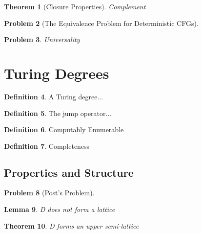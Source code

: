 \documentclass[psamsfonts]{amsart}
\newtheorem{thm}{Theorem}[section]
\newtheorem{lem}[thm]{Lemma}
\newtheorem{prob}[thm]{Problem}
\theoremstyle{definition}
\newtheorem{defn}[thm]{Definition}
\theoremstyle{remark}
\numberwithin{equation}{section}
\begin{document}
\begin{thm}[Closure Properties]
  \cite{sipser13:_introd_theor_comput}
  Complement
\end{thm}

\begin{prob}[The Equivalence Problem for Deterministic CFGs]
\cite{senizergues_det_pd_decid}
\end{prob}

\begin{prob}
  Universality
\end{prob}


\section{Turing Degrees}
\begin{defn}
  A Turing degree...
\cite{post44:_recur}
\cite{kleene54_upper_semi_lattic_degrees_recur_unsol}
\end{defn}

\begin{defn}
  The jump operator...
  
\end{defn}

\begin{defn}
  Computably Enumerable
\end{defn}

\begin{defn}
  Completeness
\end{defn}

\subsection{Properties and Structure}
\begin{prob}[Post's Problem]
  \cite{post44:_recur}
  \cite{Friedberg236}
\end{prob}


\begin{lem}
  D does not form a lattice
  \cite{kleene54_upper_semi_lattic_degrees_recur_unsol}
\end{lem}
\begin{thm}
  D forms an upper semi-lattice
  \cite{kleene54_upper_semi_lattic_degrees_recur_unsol}
\end{thm}
\end{document}
